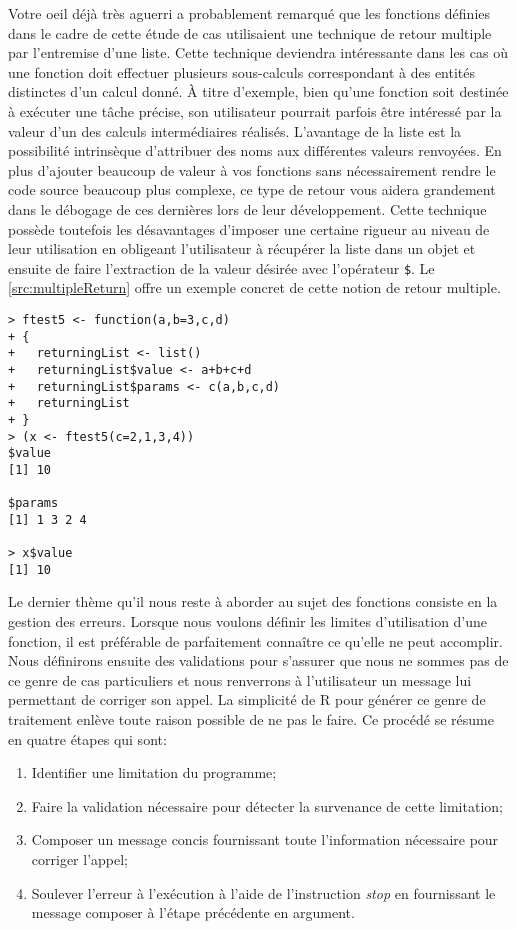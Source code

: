\vspace{\baselineskip}
Votre oeil déjà très aguerri a probablement remarqué que les fonctions définies dans le cadre de cette étude de cas utilisaient une technique de retour multiple par l'entremise d'une liste. Cette technique deviendra intéressante dans les cas où une fonction doit effectuer plusieurs sous-calculs correspondant à des entités distinctes d'un calcul donné. À titre d'exemple, bien qu'une fonction soit destinée à exécuter une tâche précise, son utilisateur pourrait parfois être intéressé par la valeur d'un des calculs intermédiaires réalisés. L'avantage de la liste est la possibilité intrinsèque d'attribuer des noms aux différentes valeurs renvoyées. En plus d'ajouter beaucoup de valeur à vos fonctions sans nécessairement rendre le code source beaucoup plus complexe, ce type de retour vous aidera grandement dans le débogage de ces dernières lors de leur développement. Cette technique possède toutefois les désavantages d'imposer une certaine rigueur au niveau de leur utilisation en obligeant l'utilisateur à récupérer la liste dans un objet et ensuite de faire l'extraction de la valeur désirée avec l'opérateur \texttt{\$}. Le \autoref{src:multipleReturn} offre un exemple concret de cette notion de retour multiple.

\begin{lstlisting}[caption = Retour multiple par l'entremise d'une liste,label=src:multipleReturn]
> ftest5 <- function(a,b=3,c,d)
+ {
+   returningList <- list()
+   returningList$value <- a+b+c+d
+   returningList$params <- c(a,b,c,d)
+   returningList
+ }
> (x <- ftest5(c=2,1,3,4))
$value
[1] 10

$params
[1] 1 3 2 4

> x$value
[1] 10
\end{lstlisting}

\vspace{\baselineskip}
Le dernier thème qu'il nous reste à aborder au sujet des fonctions consiste en la gestion des erreurs. Lorsque nous voulons définir les limites d'utilisation d'une fonction, il est préférable de parfaitement connaître ce qu'elle ne peut accomplir. Nous définirons ensuite des validations pour s'assurer que nous ne sommes pas de ce genre de cas particuliers et nous renverrons à l'utilisateur un message lui permettant de corriger son appel. La simplicité de R pour générer ce genre de traitement enlève toute raison possible de ne pas le faire. Ce procédé se résume en quatre étapes qui sont:
\begin{enumerate}
	\item Identifier une limitation du programme;
	\item Faire la validation nécessaire pour détecter la survenance de cette limitation;
	\item Composer un message concis fournissant toute l'information nécessaire pour corriger l'appel;
	\item Soulever l'erreur à l'exécution à l'aide de l'instruction \emph{stop} en fournissant le message composer à l'étape précédente en argument.
\end{enumerate}

